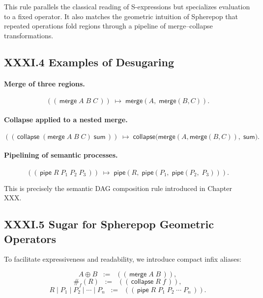 \documentclass[11pt,letterpaper]{article}
\begin{document}
\begin{remark}
This rule parallels the classical reading of S-expressions but specializes evaluation to a fixed operator. It also matches the geometric intuition of Spherepop that repeated operations fold regions through a pipeline of merge--collapse transformations.
\end{remark}

\subsection{XXXI.4 Examples of Desugaring}

\paragraph{Merge of three regions.}
\[
((\,\mathsf{merge}\; A\; B\; C\,))
\;\mapsto\;
\mathsf{merge}(A,\; \mathsf{merge}(B, C)).
\]

\paragraph{Collapse applied to a nested merge.}
\[
((\,\mathsf{collapse}\; (\mathsf{merge}\; A\; B\; C)\; \mathsf{sum}\,))
\;\mapsto\;
\mathsf{collapse}\big(\mathsf{merge}(A,\mathsf{merge}(B,C)),\; \mathsf{sum}\big).
\]

\paragraph{Pipelining of semantic processes.}
\[
((\,\mathsf{pipe}\; R\; P_1\; P_2\; P_3\,))
\;\mapsto\;
\mathsf{pipe}(R,\; \mathsf{pipe}(P_1,\; \mathsf{pipe}(P_2,\; P_3))).
\]

This is precisely the semantic DAG composition rule introduced in Chapter XXX.

\subsection{XXXI.5 Sugar for Spherepop Geometric Operators}

To facilitate expressiveness and readability, we introduce compact infix aliases:

\[
A \oplus B 
\;\;:=\;\;
((\,\mathsf{merge}\; A\; B\,)),
\]
\[
\#_f(R)
\;\;:=\;\;
((\,\mathsf{collapse}\; R\; f\,)),
\]
\[
R \mid P_1 \mid P_2 \mid \cdots \mid P_n
\;\;:=\;\;
((\,\mathsf{pipe}\; R\; P_1\; P_2\; \cdots\; P_n\,)).
\]
\end{document}
